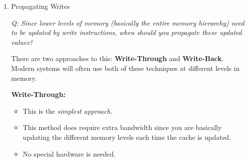\documentclass[12pt]{article}
\newenvironment{QandA}{\begin{enumerate}[label=\bfseries\arabic*.]\bfseries}
                      {\end{enumerate}}
\newenvironment{answered}{\par\quad\normalfont}{}
\begin{document}
\begin{QandA}
\begin{answered}
\quad We cannot \textbf{read tag} and \textbf{write data} in parallel because if you happen to write the wrong data - you've made a permanent change and it is hard to recover from this. Therefore, with \textit{write} operations, this is a \textbf{two-step} process where:
\begin{itemize}
    \item You first match the tag
    \item Then write to the matching \textit{way} 
\end{itemize}
This could introduce structural hazards and will require bypassing to avoid unnecessary stalls.
\end{answered}

\item Propagating Writes
\begin{answered}
\textit{Q: Since lower levels of memory (basically the entire memory hierarchy) need to be updated by write instructions, when should you propagate these updated values?}

\quad There are two approaches to this: \textbf{Write-Through} and \textbf{Write-Back}. Modern systems will often use both of these techniques at different levels in memory. 

\textbf{Write-Through:}
\begin{itemize}
    \item This is the \textit{simplest approach}.
    \item This method does require extra bandwidth since you are basically updating the different memory levels each time the cache is updated.
    \item No special hardware is needed.
\end{itemize}


\end{answered}
\end{QandA}
\end{document}
